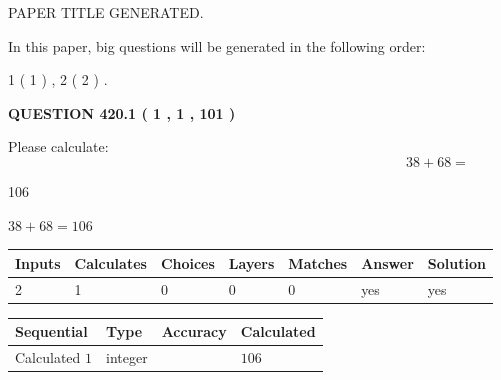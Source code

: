 \documentclass[12pt]{article}
\begin{document}
   
 PAPER TITLE GENERATED.
   
   
   
\vspace{0.2in}
   
In this paper, big questions will be generated in the following order: 
   
   
   1 ( 1 )
 ,
   2 ( 2 )
 .
  
\vspace{0.2in}
  
{\textbf{\Large{QUESTION
420.1 
 ( 1 , 1 , 101 )
}}}
  
  
 
Please calculate:
\begin{equation}
38 +  %
68 = \nonumber
\end{equation}
 
 
 
\noindent{}
 
 

106
 
 
\noindent{}
 
 

 
 
 
\noindent{}
 
 

$ %
38 +  %
68=   %
106$
 
 
\noindent{}
 
 

 
   
   
   
   
\noindent\begin{tabular}{|l|l|l|l|l|l|l|}
 \hline
Inputs & Calculates & Choices & Layers & Matches & Answer & Solution \\ \hline
 2  & 
 1  & 
 0
  & 
 0  & 
 0  & 
  yes & 
  yes 
  \\ \hline
 \end{tabular}
   
   
   
   
\noindent{}
   
   
  
  
\noindent\begin{tabular}{|l|l|l|l|}
\hline
 Sequential & Type & Accuracy & Calculated \\ 
\hline
 
 
  Calculated $  1 $ & integer &  & 
  $ 106 $ 
 \\  \hline  
 \end{tabular}
   
\end{document}
